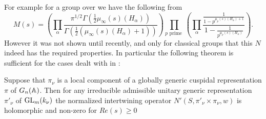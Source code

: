     For example for a group over \Q we have the following from \cite{langlandsEulerProductsa} 
    \[M(s) = \left( \prod_\alpha\frac{\pi^{1/2}\Gamma(\frac{1}{2}\mu_\infty(s)(H_\alpha))}{\Gamma(\frac{1}{2}(\mu_\infty(s)(H_\alpha) + 1))} \right)\prod_{p \text{ prime }} \left( \prod_\alpha \frac{\frac{1}{1 - p^{\mu_p(s)(H_\alpha) + 1}}}{1 - \frac{1}{p^{\mu_p(s)(H_\alpha) }}}\right).\]
     However it was not shown until recently, and only for classical groups that this \(N\) indeed has the required properties. In particular the following theorem is sufficient for the cases dealt with in \cite{jiangPolesCertainResidual2013}:
     \begin{Theorem}
        Suppose that \(\pi_\nu\) is a local component of a globally generic cuspidal representation \(\pi\) of \(G_n(\A)\). Then for any irreducible admissible unitary generic representation \(\pi'_\nu\) of \(\operatorname{GL}_m(k_\nu)\) the normalized intertwining operator \(N'(S, \pi'_\nu\times \pi_\nu, w)\) is holomorphic and non-zero for \(Re(s)\geq 0\)
     \end{Theorem}
